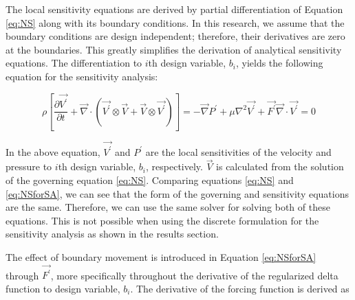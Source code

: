 \documentclass[12pt]{aiaa-pretty}
\begin{document}
The local sensitivity equations are derived by partial differentiation of Equation \eqref{eq:NS} along with its boundary conditions. In this research, we assume that the boundary conditions are design independent; therefore, their derivatives are zero at the boundaries. This greatly simplifies the derivation of analytical sensitivity equations. The differentiation to $i$th design variable, $b_i$, yields the following equation for the sensitivity analysis:

%
\begin{subequations}\label{eq:NSforSA}
\begin{equation}
	\rho \left[
	\frac{\partial \vec{V^\prime}}{\partial t} + 
	\vec{\nabla} \cdot \left( \vec{V^\prime} \otimes \vec{V} + \vec{V} \otimes \vec{V^\prime} \right) 
	\right] = 
	-\vec{\nabla} P^\prime + \mu \nabla^2 \vec{V^\prime} + \vec{F^\prime}
\end{equation}
\begin{equation}
	\vec{\nabla} \cdot \vec{V^\prime} = 0
\end{equation}
\end{subequations}
%

In the above equation, $\vec{V^\prime}$ and $P^\prime$ are the local sensitivities of the velocity and pressure to $i$th design variable, $b_i$, respectively. $\vec{V}$ is calculated from the solution of the governing equation \eqref{eq:NS}. Comparing equations \eqref{eq:NS} and \eqref{eq:NSforSA}, we can see that the form of the governing and sensitivity equations are the same. Therefore, we can use the same solver for solving both of these equations. This is not possible when using the discrete formulation for the sensitivity analysis as shown in the results section.

The effect of boundary movement is introduced in Equation \eqref{eq:NSforSA} through $\vec{F^\prime}$, more specifically throughout the derivative of the regularized delta function to design variable, $b_i$. The derivative of the forcing function is derived as
\end{document}
